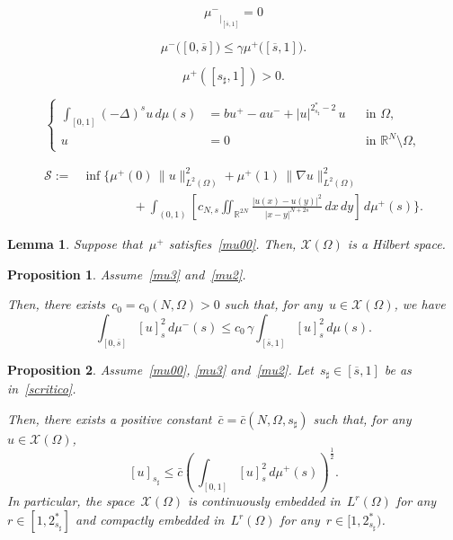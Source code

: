 \documentclass[10pt,a4paper]{amsart}
\newtheorem{lemma}{Lemma}
\newtheorem{proposition}{Proposition}
\def \R {\mathbb{R}}
\renewcommand{\le}{\leqslant}
\begin{document}
\begin{equation}\label{mu3}
{\mu^-}_{\big|_{[\overline s, 1]}}=0
\end{equation}

\begin{equation}\label{mu2}
\mu^-\big([{{ 0 }}, \overline s]\big)\le\gamma
\mu^+\big([\overline s, 1]\big).
\end{equation}

\begin{equation}\label{scritico}
\mu^+ ([s_\sharp, 1])> 0.
\end{equation}

\begin{equation} \label{mainab}
\left\{\begin{aligned}
\int_{[{{ 0 }}, 1]} (-\Delta)^s u\, d\mu(s) & = bu^+ - au^- + |u|^{2_{s_\sharp}^\ast - 2}\, u && \text{in } \Omega,\\
u & = 0 && \text{in } \R^N \setminus \Omega,
\end{aligned}\right.
\end{equation}

\begin{equation}\label{best_rho}\begin{split}{\mathcal{S}}:=&\inf\Bigg\{
\mu^+(0)\,\|u\|^2_{L^2(\Omega)}
+\mu^+(1)\,\|\nabla u\|^2_{L^2(\Omega)}
\\&\qquad\qquad+
\int_{({{ 0 }},1)}\left[
{c_{N,s}} \iint_{\R^{2N}} \frac{| u(x)-u(y)|^2}{|x-y|^{N+2s}}\, dx\,dy\right]\,d\mu^+(s)
\Bigg\}.\end{split}\end{equation}

\begin{lemma}\label{hilbert}
Suppose that~$\mu^+$ satisfies~\eqref{mu00}.
Then, $\mathcal{X}(\Omega)$ is a Hilbert space.
\end{lemma}

\begin{proposition}\label{crucial} Assume~\eqref{mu3} and~\eqref{mu2}.

Then, there exists~$c_0=c_0(N,\Omega)>0$ such that,
for any~$u\in\mathcal{X}(\Omega)$, we have
\[
\int_{[{{ 0 }}, \overline s]} [u]_{s}^2 \, d\mu^- (s) \le c_0\,\gamma \int_{[\overline s, 1]} [u]^2_{s} \, d\mu(s).
\]
\end{proposition}

\begin{proposition}\label{emb}Assume~\eqref{mu00}, \eqref{mu3} and~\eqref{mu2}.
Let~$s_\sharp\in [\overline s, 1]$ be as in~\eqref{scritico}. 

Then, there exists a positive constant~$\bar c =\bar c (N,\Omega, s_\sharp)$ such that, for any~$u\in \mathcal{X}(\Omega)$,
\begin{equation}\label{pqwodfl134rt}
[u]_{s_\sharp}\le \bar{c}\left(\, \int_{[{{ 0 }}, 1]} [u]^2_{s}\, d\mu^+ (s)\right)^{\frac12}.
\end{equation}
In particular, the space~$\mathcal{X}(\Omega)$ is continuously embedded in~$L^r(\Omega)$ for any~$r\in [1, 2^*_{s_\sharp}]$ and
compactly embedded in~$L^r(\Omega)$ for any~$r\in [1, 2^*_{s_\sharp})$.
\end{proposition}
\end{document}
